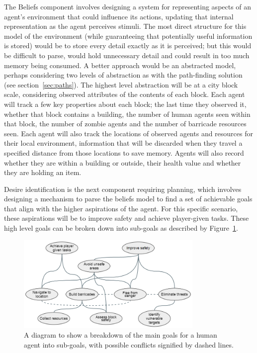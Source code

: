 \documentclass[12pt,a4paper]{article}
\begin{document}
The Beliefs component involves designing a system for representing aspects of an agent's environment that could influence its actions, updating that internal representation as the agent perceives stimuli. The most direct structure for this model of the environment (while guaranteeing that potentially useful information is stored) would be to store every detail exactly as it is perceived; but this would be difficult to parse, would hold unnecessary detail and could result in too much memory being consumed. A better approach would be an abstracted model, perhaps considering two levels of abstraction as with the path-finding solution (see section~\ref{sec:paths}). The highest level abstraction will be at a city block scale, considering observed attributes of the contents of each block. Each agent will track a few key properties about each block; the last time they observed it, whether that block contains a building, the number of human agents seen within that block, the number of zombie agents and the number of barricade resources seen. Each agent will also track the locations of observed agents and resources for their local environment, information that will be discarded when they travel a specified distance from those locations to save memory. Agents will also record whether they are within a building or outside, their health value and whether they are holding an item.

Desire identification is the next component requiring planning, which involves designing a mechanism to parse the beliefs model to find a set of achievable goals that align with the higher aspirations of the agent. For this specific scenario, these aspirations will be to improve safety and achieve player-given tasks. These high level goals can be broken down into sub-goals as described by Figure~\ref{fig:goals}.

\label{sec:bdi}
\begin{figure}[h]
\centering
\includegraphics[width=0.8\textwidth]{goals}
\caption{A diagram to show a breakdown of the main goals for a human agent into sub-goals, with possible conflicts signified by dashed lines.}
\label{fig:goals}
\end{figure}
\end{document}
